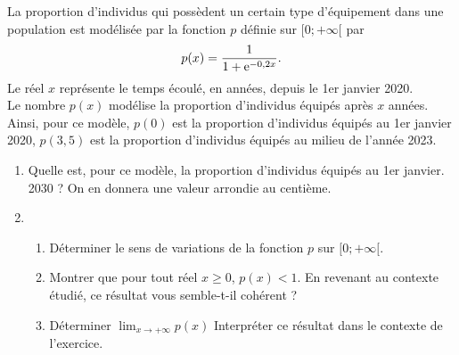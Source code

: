 \documentclass[11pt,fleqn, openany]{book} %
\begin{document}
\begin{exercise}[topic=lim24, subtitle={(Antilles - Guyane 2019)}]
La proportion d'individus qui possèdent un certain type d'équipement dans une 
population est modélisée par la fonction $p$ définie sur $[0;+\infty[$ par
\[p(x)=\dfrac{1}{1+\mathrm{e}^{-0,2x}}.\]
Le réel $x$ représente le temps écoulé, en années, depuis le 1er janvier 2020.\\
Le nombre $p(x)$ modélise la proportion d'individus équipés après $x$ années.\\
Ainsi, pour ce modèle, $p(0)$ est la proportion d'individus équipés au 1er janvier 2020, $p(3,5)$ est la proportion d'individus équipés au milieu de l'année 2023.
\vskip10pt
\begin{enumerate}
\item Quelle est, pour ce modèle, la proportion d'individus équipés au 1er janvier.
2030 ? On en donnera une valeur arrondie au centième.
\item \begin{enumerate}
\item Déterminer le sens de variations de la fonction $p$ sur $[0;+\infty[$.
\item Montrer que pour tout réel $x\geqslant 0$, $p(x) <1$. En revenant au contexte étudié, ce résultat vous semble-t-il cohérent ?
\item  Déterminer $\displaystyle\lim_{x \to + \infty}p(x)$ Interpréter ce résultat dans le contexte de l'exercice.
\end{enumerate}
\end{enumerate}
\newpage
\end{exercise}
\end{document}
